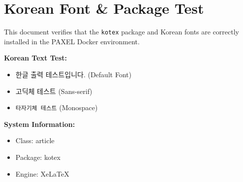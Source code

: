 \documentclass{article}
\begin{document}
\section*{Korean Font \& Package Test}

This document verifies that the \texttt{kotex} package and Korean fonts are correctly installed in the PAXEL Docker environment.

\vspace{1cm}

\textbf{Korean Text Test:}
\begin{itemize}
    \item 한글 출력 테스트입니다. (Default Font)
    \item \textsf{고딕체 테스트} (Sans-serif)
    \item \texttt{타자기체 테스트} (Monospace)
\end{itemize}

\vspace{1cm}

\textbf{System Information:}
\begin{itemize}
    \item Class: article
    \item Package: kotex
    \item Engine: XeLaTeX
\end{itemize}
\end{document}
